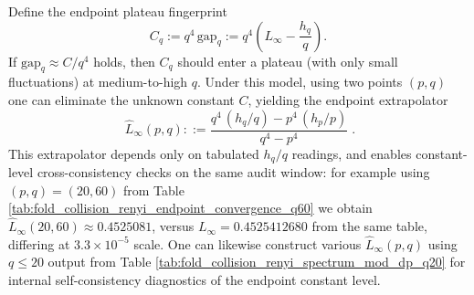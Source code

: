\begin{remark}\label{rem:pom-endpoint-extrapolator}
Define the endpoint plateau fingerprint
\[
C_q:=q^4\,\mathrm{gap}_q
:=q^4\left(L_\infty-\frac{h_q}{q}\right).
\]
If \(\mathrm{gap}_q\approx C/q^4\) holds, then \(C_q\) should enter a plateau (with only small fluctuations) at medium-to-high \(q\).
Under this model, using two points \((p,q)\) one can eliminate the unknown constant \(C\), yielding the endpoint extrapolator
\[
\boxed{\;
\widehat L_\infty(p,q)
::=\frac{q^4\,(h_q/q)-p^4\,(h_p/p)}{q^4-p^4}\; }.
\]
This extrapolator depends only on tabulated \(h_q/q\) readings, and enables constant-level cross-consistency checks on the same audit window:
for example using \((p,q)=(20,60)\) from Table \ref{tab:fold_collision_renyi_endpoint_convergence_q60} we obtain
\(
\widehat L_\infty(20,60)\approx 0.4525081
\),
versus \(L_\infty=0.4525412680\) from the same table, differing at \(3.3\times 10^{-5}\) scale.
One can likewise construct various \(\widehat L_\infty(p,q)\) using \(q\le 20\) output from Table \ref{tab:fold_collision_renyi_spectrum_mod_dp_q20} for internal self-consistency diagnostics of the endpoint constant level.
\end{remark}

